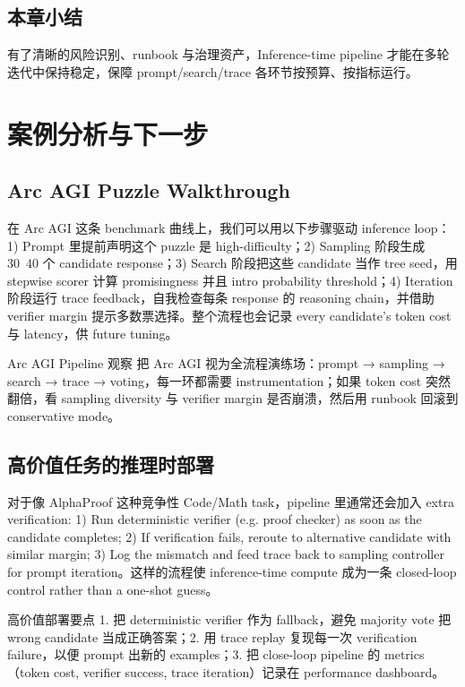 \documentclass[a4paper]{article}
\begin{document}
\subsection{本章小结}
有了清晰的风险识别、runbook 与治理资产，Inference-time pipeline 才能在多轮迭代中保持稳定，保障 prompt/search/trace 各环节按预算、按指标运行。

\section{案例分析与下一步}

\subsection{Arc AGI Puzzle Walkthrough}
在 Arc AGI 这条 benchmark 曲线上，我们可以用以下步骤驱动 inference loop：1) Prompt 里提前声明这个 puzzle 是 high-difficulty；2) Sampling 阶段生成 30~40 个 candidate response；3) Search 阶段把这些 candidate 当作 tree seed，用 stepwise scorer 计算 promisingness 并且 intro probability threshold；4) Iteration 阶段运行 trace feedback，自我检查每条 response 的 reasoning chain，并借助 verifier margin 提示多数票选择。整个流程也会记录 every candidate’s token cost 与 latency，供 future tuning。

\begin{importantbox}{Arc AGI Pipeline 观察}
把 Arc AGI 视为全流程演练场：prompt → sampling → search → trace → voting，每一环都需要 instrumentation；如果 token cost 突然翻倍，看 sampling diversity 与 verifier margin 是否崩溃，然后用 runbook 回滚到 conservative mode。
\end{importantbox}

\subsection{高价值任务的推理时部署}
对于像 AlphaProof 这种竞争性 Code/Math task，pipeline 里通常还会加入 extra verification: 1) Run deterministic verifier (e.g. proof checker) as soon as the candidate completes; 2) If verification fails, reroute to alternative candidate with similar margin; 3) Log the mismatch and feed trace back to sampling controller for prompt iteration。这样的流程使 inference-time compute 成为一条 closed-loop control rather than a one-shot guess。

\begin{knowledgebox}{高价值部署要点}
1. 把 deterministic verifier 作为 fallback，避免 majority vote 把 wrong candidate 当成正确答案；2. 用 trace replay 复现每一次 verification failure，以便 prompt 出新的 examples；3. 把 close-loop pipeline 的 metrics（token cost, verifier success, trace iteration）记录在 performance dashboard。
\end{knowledgebox}
\end{document}
